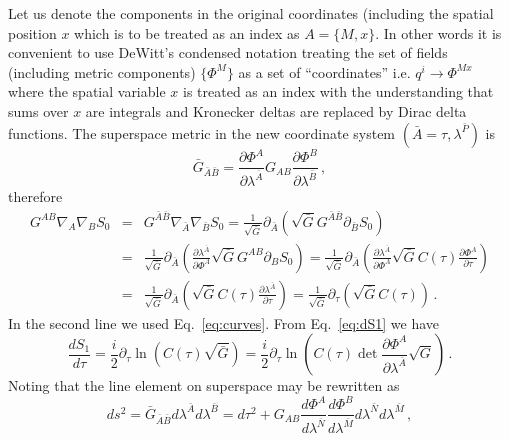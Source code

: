 \documentclass[a4paper,11pt]{article}
\numberwithin{equation}{section}
\begin{document}
Let us denote the components in the original coordinates (including
the spatial position $x$ which is to be treated as an index as $A=\{M,x\}$. In other words it is convenient to use DeWitt's condensed notation treating the set of fields (including metric components) $\{\Phi^{M}\}$ as a set of ``coordinates'' i.e. $q^{i}\rightarrow\Phi^{Mx}$ where the spatial variable $x$  is treated as an index with the understanding that sums over $x$ are integrals and Kronecker deltas are replaced by Dirac delta functions. The superspace metric in the new coordinate system $(\bar{A}=\tau,\lambda^{\bar{P}})$ is 
\begin{equation}
\bar{G}_{\bar{A}\bar{B}}=\frac{\partial\Phi^{A}}{\partial\lambda^{\bar{A}}}G_{AB}\frac{\partial\Phi^{B}}{\partial\lambda^{\bar{B}}} \,,\label{eq:metricnew}
\end{equation}
therefore
\begin{eqnarray}
G^{AB}\nabla_{A}\nabla_{B}S_{0} & = & G^{\bar{A}\bar{B}}\nabla_{\bar{A}}\nabla_{\bar{B}}S_{0}=\frac{1}{\sqrt{\bar{G}}}\partial_{\bar{A}}\left(\sqrt{\bar{G}}G^{\bar{A}\bar{B}}\partial_{\bar{B}}S_{0}\right)\nonumber \\
 & = & \frac{1}{\sqrt{\bar{G}}}\partial_{\bar{A}}\left(\frac{\partial\lambda^{\bar{A}}}{\partial\Phi^{A}}\sqrt{\bar{G}}G^{AB}\partial_{B}S_{0}\right)=\frac{1}{\sqrt{\bar{G}}}\partial_{\bar{A}}\left(\frac{\partial\lambda^{\bar{A}}}{\partial\Phi^{A}}\sqrt{\bar{G}}C(\tau)\frac{\partial\Phi^{A}}{\partial\tau}\right)\nonumber \\
 & = & \frac{1}{\sqrt{\bar{G}}}\partial_{\bar{A}}\left(\sqrt{\bar{G}}C(\tau)\frac{\partial\lambda^{\bar{A}}}{\partial\tau}\right)=\frac{1}{\sqrt{\bar{G}}}\partial_{\tau}\left(\sqrt{\bar{G}}C(\tau)\right)\,. \label{eq:Laplacian}
\end{eqnarray}
In the second line we used Eq.~\eqref{eq:curves}. From Eq.~\eqref{eq:dS1} we have
\begin{equation}
\frac{dS_{1}}{d\tau}=\frac{i}{2}\partial_{\tau}\ln\left(C(\tau)\sqrt{\bar{G}}\right)=\frac{i}{2}\partial_{\tau}\ln\left(C(\tau)\det\frac{\partial\Phi^{A}}{\partial\lambda^{\bar{A}}}\sqrt{G}\right) \,.\label{eq:dS1-2}
\end{equation}
Noting that the line element on superspace may be rewritten as 
\begin{equation}
ds^{2}=\bar{G}{}_{\bar{A}\bar{B}}d\lambda^{\bar{A}}d\lambda^{\bar{B}}=d\tau^{2}+G_{AB}\frac{d\Phi^{A}}{d\lambda^{\bar{N}}}\frac{d\Phi^{B}}{d\lambda^{\bar{M}}}d\lambda^{\bar{N}}d\lambda^{\bar{M}} \,,\label{eq:lineelement}
\end{equation}
\end{document}
